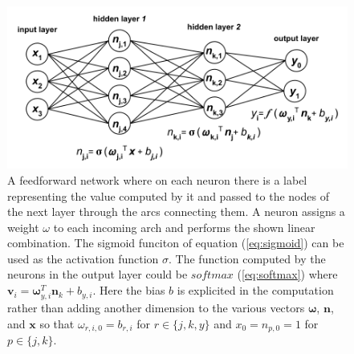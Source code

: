 \documentclass[12pt]{article}
\newcommand{\vect}[1]{\boldsymbol{#1}}
\begin{document}
\begin{figure}[h]
	\centering
	\includegraphics[width=\textwidth]{mlp}
	\caption{A feedforward network where on each neuron there is a label representing the value computed by it and passed to the nodes of the next layer through the arcs connecting them. A neuron assigns a weight $ \omega $ to each incoming arch and performs the shown linear combination. The sigmoid funciton of equation (\ref{eq:sigmoid}) can be used as the activation function $\sigma$. The function computed by the neurons in the output layer could be $softmax$ (\ref{eq:softmax}) where $\vect{v}_i = \vect{\omega}_{y,i}^T\vect{n}_k + b_{y,i}$. Here the bias $ b $ is explicited in the computation rather than adding another dimension to the various vectors $ \vect{\omega} $, $ \vect{n}$, and $ \vect{x} $ so that $ \omega_{r,i,0} = b_{r,i} $ for $ r \in \{j,k,y\} $ and $ x_{0} = n_{p,0} = 1 $ for $p \in \{j,k\} $.}
\label{fig:mlp}
\end{figure}
\end{document}
